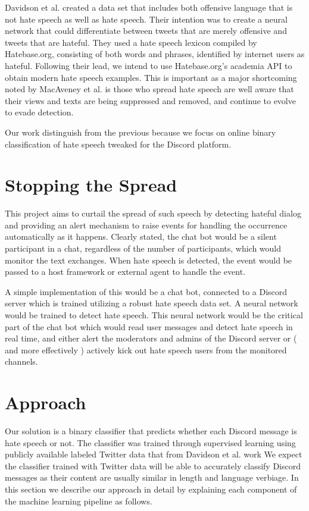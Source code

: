 \documentclass[conference]{sig-alternate-05-2015}
\begin{document}
Davidson et al. created a data set that includes both offensive language that is not hate speech as well as hate speech. Their intention was to create a neural network that could differentiate between tweets that are merely offensive and tweets that are hateful. They used a hate speech lexicon compiled by Hatebase.org, consisting of both words and phrases, identified by internet users as hateful.  Following their lead, we intend to use Hatebase.org's academia API to obtain modern hate speech examples.  This is important as a major shortcoming noted by MacAveney et al.\cite{MacAvaneyetal.} is those who spread hate speech are well aware that their views and texts are being suppressed and removed, and continue to evolve to evade detection.

Our work distinguish from the previous because we focus on online binary classification of hate speech tweaked for the Discord platform.  

\section{Stopping the Spread}\label{sec:design}
This project aims to curtail the spread of such speech by detecting hateful dialog and providing an alert mechanism to raise events for handling the occurrence automatically as it happens.  Clearly stated, the chat bot would be a silent participant in a chat, regardless of the number of participants, which would monitor the text exchanges.  When hate speech is detected, the event would be passed to a host framework or external agent to handle the event.

A simple implementation of this would be a chat bot, connected to a Discord server which is trained utilizing a robust hate speech data set. A neural network would be trained to detect hate speech. This neural network would be the critical part of the chat bot which would read user messages and detect hate speech in real time, and either alert the moderators and admins of the Discord server or ( and more effectively ) actively kick out hate speech users from the monitored channels.

\section{Approach}\label{sec:approach}
Our solution is a binary classifier that predicts whether each Discord message is hate speech or not. The classifier was trained through supervised learning using publicly available labeled Twitter data that from Davidson et al. work \cite{Davidsonetal.}
We expect the classifier trained with Twitter data will be able to accurately classify Discord messages as their content are usually similar in length and language verbiage. 
In this section we describe our approach in detail by explaining each component of the machine learning pipeline as follows.
 
\end{document}
